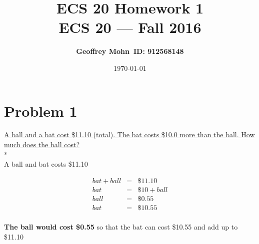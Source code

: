 \documentclass[11pt]{article}
\title{\bf ECS 20 Homework 1\\[2ex] 
	\rm\normalsize ECS 20 --- Fall 2016}
\date{\today}
\author{\bf Geoffrey Mohn\ ID: 912568148}
\begin{document}
	\maketitle
	
	
	\section*{Problem 1} 
	{\underline{A ball and a bat cost \$11.10 (total). The bat costs \$10.0 more than the ball. How much does the ball cost?}}\\*\\

	A ball and bat costs \$11.10
	
	\begin{eqnarray*}
	bat + ball &=& \$11.10\\
	bat &=& \$10 + ball\\
	ball &=& \$0.55	\\
	bat &=& \$10.55\\
	\end{eqnarray*}
	
	\textbf{The ball would cost \$0.55} so that the bat can cost \$10.55 and add up to \$11.10
\end{document}
